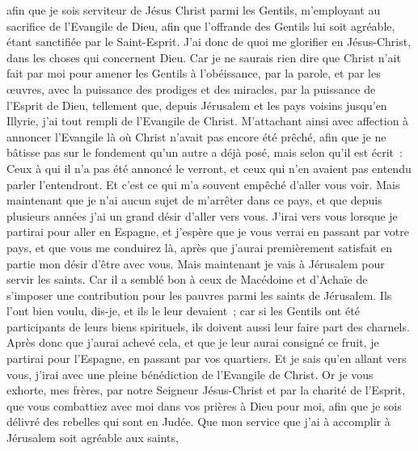 \begin{multicols}{2}
afin que je sois serviteur de Jésus Christ parmi les Gentils, m'employant au sacrifice de l'Evangile de Dieu, afin que l'offrande des Gentils lui soit agréable, étant sanctifiée par le Saint-Esprit.
J'ai donc de quoi me glorifier en Jésus-Christ, dans les choses qui concernent Dieu.
Car je ne saurais rien dire que Christ n'ait fait par moi pour amener les Gentils à l'obéissance, par la parole, et par les œuvres,
avec la puissance des prodiges et des miracles, par la puissance de l'Esprit de Dieu, tellement que, depuis Jérusalem et les pays voisins jusqu'en Illyrie, j'ai tout rempli de l'Evangile de Christ.
M'attachant ainsi avec affection à annoncer l'Evangile là où Christ n'avait pas encore été prêché, afin que je ne bâtisse pas sur le fondement qu'un autre a déjà posé, 
mais selon qu'il est écrit~: Ceux à qui il n'a pas été annoncé le verront, et ceux qui n'en avaient pas entendu parler l'entendront.
Et c'est ce qui m'a souvent empêché d'aller vous voir.
Mais maintenant que je n'ai aucun sujet de m'arrêter dans ce pays, et que depuis plusieurs années j'ai un grand désir d'aller vers vous.
J'irai vers vous lorsque je partirai pour aller en Espagne, et j'espère que je vous verrai en passant par votre pays, et que vous me conduirez là, après que j'aurai premièrement satisfait en partie mon désir d'être avec vous.
Mais maintenant je vais à Jérusalem pour servir les saints.
Car il a semblé bon à ceux de Macédoine et d'Achaïe de s'imposer une contribution pour les pauvres parmi les saints de Jérusalem.
Ils l'ont bien voulu, dis-je, et ils le leur devaient~; car si les Gentils ont été participants de leurs biens spirituels, ils doivent aussi leur faire part des charnels.
Après donc que j'aurai achevé cela, et que je leur aurai consigné ce fruit, je partirai pour l'Espagne, en passant par vos quartiers.
Et je sais qu'en allant vers vous, j'irai avec une pleine bénédiction de l'Evangile de Christ.
Or je vous exhorte, mes frères, par notre Seigneur Jésus-Christ et par la charité de l'Esprit, que vous combattiez avec moi dans vos prières à Dieu pour moi,
afin que je sois délivré des rebelles qui sont en Judée. Que mon service que j'ai à accomplir à Jérusalem soit agréable aux saints,

\end{multicols}
